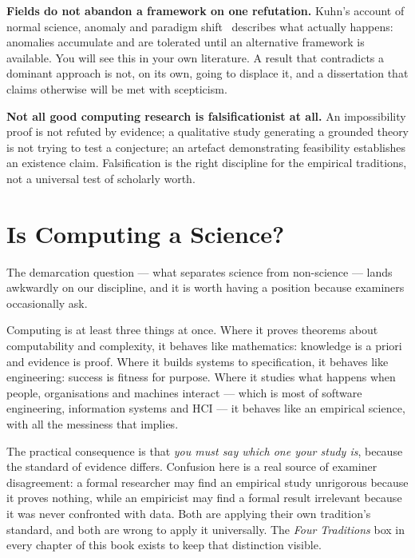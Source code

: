 \textbf{Fields do not abandon a framework on one refutation.} Kuhn's account of
normal science, anomaly and paradigm shift~\cite{kuhn1962structure} describes
what actually happens: anomalies accumulate and are tolerated until an
alternative framework is available. You will see this in your own literature.
A result that contradicts a dominant approach is not, on its own, going to
displace it, and a dissertation that claims otherwise will be met with
scepticism.

\textbf{Not all good computing research is falsificationist at all.}
An impossibility proof is not refuted by evidence; a qualitative study
generating a grounded theory is not trying to test a conjecture; an artefact
demonstrating feasibility establishes an existence claim. Falsification is the
right discipline for the empirical traditions, not a universal test of
scholarly worth.

\section{Is Computing a Science?}

The demarcation question --- what separates science from non-science --- lands
awkwardly on our discipline, and it is worth having a position because
examiners occasionally ask.

Computing is at least three things at once. Where it proves theorems about
computability and complexity, it behaves like mathematics: knowledge is a
priori and evidence is proof. Where it builds systems to specification, it
behaves like engineering: success is fitness for purpose. Where it studies what
happens when people, organisations and machines interact --- which is most of
software engineering, information systems and HCI --- it behaves like an
empirical science, with all the messiness that implies.

The practical consequence is that \emph{you must say which one your study is},
because the standard of evidence differs. Confusion here is a real source of
examiner disagreement: a formal researcher may find an empirical study
unrigorous because it proves nothing, while an empiricist may find a formal
result irrelevant because it was never confronted with data. Both are applying
their own tradition's standard, and both are wrong to apply it universally.
The \emph{Four Traditions} box in every chapter of this book exists to keep
that distinction visible.

